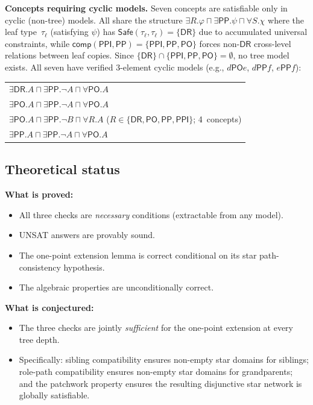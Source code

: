 \documentclass[a4paper,11pt]{article}
\theoremstyle{definition}
\newcommand{\DR}{\ensuremath{\mathsf{DR}}}
\newcommand{\PO}{\ensuremath{\mathsf{PO}}}
\newcommand{\PP}{\ensuremath{\mathsf{PP}}}
\newcommand{\PPI}{\ensuremath{\mathsf{PPI}}}
\newcommand{\comp}{\ensuremath{\mathsf{comp}}}
\newcommand{\Safe}{\ensuremath{\mathsf{Safe}}}
\begin{document}
\noindent\textbf{Concepts requiring cyclic models.}\;
Seven concepts are satisfiable only in cyclic (non-tree) models.
All share the structure $\exists R.\varphi \sqcap \exists\PP.\psi
\sqcap \forall S.\chi$ where the leaf type~$\tau_\ell$
(satisfying $\psi$) has $\Safe(\tau_\ell, \tau_\ell) = \{\DR\}$
due to accumulated universal constraints, while
$\comp(\PPI, \PP) = \{\PPI, \PP, \PO\}$ forces non-$\DR$
cross-level relations between leaf copies.
Since $\{\DR\} \cap \{\PPI, \PP, \PO\} = \emptyset$,
no tree model exists.  All seven have verified 3-element
cyclic models (e.g., $d \mathbin{\PO} e$, $d \mathbin{\PP} f$,
$e \mathbin{\PP} f$):
\begin{center}\small
\begin{tabular}{l}
$\exists\DR.A \sqcap \exists\PP.\neg A \sqcap \forall\PO.A$ \\
$\exists\PO.A \sqcap \exists\PP.\neg A \sqcap \forall\PO.A$ \\
$\exists\PO.A \sqcap \exists\PP.\neg B \sqcap \forall R.A$
  \quad ($R \in \{\DR, \PO, \PP, \PPI\}$; 4~concepts) \\
$\exists\PP.A \sqcap \exists\PP.\neg A \sqcap \forall\PO.A$ \\
\end{tabular}
\end{center}

\subsection{Theoretical status}

\noindent\textbf{What is proved:}
\begin{itemize}[nosep]
\item All three checks are \emph{necessary} conditions
  (extractable from any model).
\item UNSAT answers are provably sound.
\item The one-point extension lemma is correct conditional
  on its star path-consistency hypothesis.
\item The algebraic properties are unconditionally correct.
\end{itemize}

\noindent\textbf{What is conjectured:}
\begin{itemize}[nosep]
\item The three checks are jointly \emph{sufficient}
  for the one-point extension at every tree depth.
\item Specifically: sibling compatibility ensures non-empty star
  domains for siblings; role-path compatibility ensures non-empty
  star domains for grandparents; and the patchwork property
  ensures the resulting disjunctive star network is globally
  satisfiable.
\end{itemize}
\end{document}
